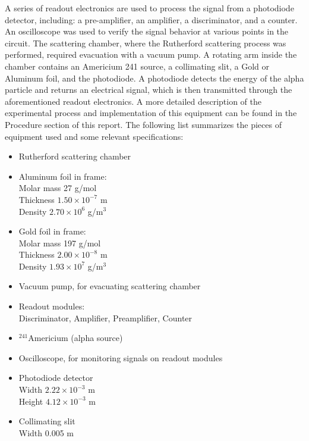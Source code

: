 \documentclass[a4paper]{article}
\begin{document}
\qq A series of readout electronics are used to process the signal from a photodiode detector, including: a pre-amplifier, an amplifier, a discriminator, and a counter. An oscilloscope was used to verify the signal behavior at various points in the circuit. The scattering chamber, where the Rutherford scattering process was performed, required evacuation with a vacuum pump. A rotating arm inside the chamber contains an Americium 241 source, a collimating slit, a Gold or Aluminum foil, and the photodiode. A photodiode detects the energy of the alpha particle and returns an electrical signal, which is then transmitted
through the aforementioned readout electronics. A more detailed description of the experimental process and implementation of this equipment can be found in the Procedure section of this report. The following list summarizes the pieces of equipment used and some relevant specifications:

\begin{itemize}
\item Rutherford scattering chamber
\item Aluminum foil in frame:  \\
      Molar mass 27 g/mol \\
      Thickness $1.50 \times 10^{-7}$ m \\
      Density $2.70 \times 10^6$ g/m$^3$
\item Gold foil in frame: \\
      Molar mass 197 g/mol \\
      Thickness $2.00 \times 10^{-8}$ m \\
      Density $1.93 \times 10^7$ g/m$^3$
\item Vacuum pump, for evacuating scattering chamber
\item Readout modules: \\
      Discriminator, Amplifier, Preamplifier, Counter
\item $ ^{241}$Americium (alpha source)
\item Oscilloscope, for monitoring signals on readout modules
\item Photodiode detector \\
	  Width $2.22 \times 10^{-3}$ m \\
	  Height $4.12 \times 10^{-3}$ m
\item Collimating slit \\
      Width 0.005 m
\end{itemize}
\end{document}
